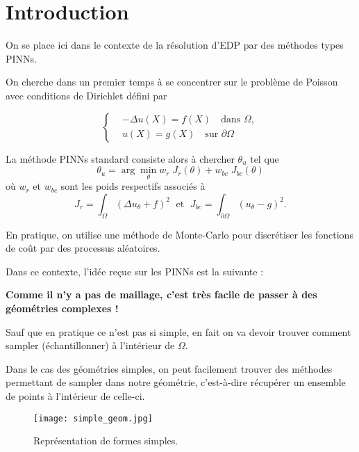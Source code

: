 \section{Introduction} \label{levelset_intro}

On se place ici dans le contexte de la résolution d'EDP par des méthodes types PINNs. 

On cherche dans un premier temps à se concentrer sur le problème de Poisson avec conditions de Dirichlet défini par

\begin{equation*}
	\left\{\begin{aligned}
		&-\Delta u(X) = f(X) \quad \text{dans } \Omega, \\
		&u(X) = g(X) \quad \text{sur } \partial \Omega
	\end{aligned}\right.
\end{equation*}

La méthode PINNs standard consiste alors à chercher $\theta_u$ tel que
\begin{equation*}
	\theta_u = \arg\min_{\theta} w_{r}\; J_{r}(\theta)+w_{bc}\; J_{bc}(\theta)
\end{equation*}
où $w_{r}$ et $w_{bc}$ sont les poids respectifs associés à
\begin{equation*}
	J_{r} = \int_\Omega (\Delta u_\theta+f)^2 \; \text{ et } \; J_{bc} = \int_{\partial\Omega} (u_\theta-g)^2.
\end{equation*}	

\begin{Rem}
	En pratique, on utilise une méthode de Monte-Carlo pour discrétiser les fonctions de coût par des processus aléatoires.
\end{Rem}

Dans ce contexte, l'idée reçue sur les PINNs est la suivante : 

\textbf{Comme il n'y a pas de maillage, c'est très facile de passer à des géométries complexes !}

Sauf que en pratique ce n'est pas si simple, en fait on va devoir trouver comment sampler (échantillonner) à l'intérieur de $\Omega$.

Dans le cas des géométries simples, on peut facilement trouver des méthodes permettant de sampler dans notre géométrie, c'est-à-dire récupérer un ensemble de points à l'intérieur de celle-ci.

\begin{figure}[H]
	\centering
	\texttt{[image: simple\_geom.jpg]}
	\caption{Représentation de formes simples.}
\end{figure}

